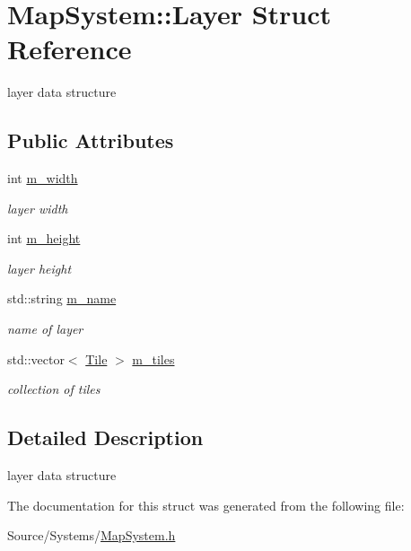 \hypertarget{struct_map_system_1_1_layer}{}\section{Map\+System\+:\+:Layer Struct Reference}
\label{struct_map_system_1_1_layer}


layer data structure  


\subsection*{Public Attributes}
\begin{DoxyCompactItemize}
\item 
\mbox{\label{struct_map_system_1_1_layer_aa16500709056b208b622705066e8bde1}} 
int \mbox{\hyperlink{struct_map_system_1_1_layer_aa16500709056b208b622705066e8bde1}{m\+\_\+width}}
\begin{DoxyCompactList}\small\item\em layer width \end{DoxyCompactList}\item 
\mbox{\label{struct_map_system_1_1_layer_ac993746071bcb5569752ef1a91d4046a}} 
int \mbox{\hyperlink{struct_map_system_1_1_layer_ac993746071bcb5569752ef1a91d4046a}{m\+\_\+height}}
\begin{DoxyCompactList}\small\item\em layer height \end{DoxyCompactList}\item 
\mbox{\label{struct_map_system_1_1_layer_a141c61aca2b7be1133c9646525c039ef}} 
std\+::string \mbox{\hyperlink{struct_map_system_1_1_layer_a141c61aca2b7be1133c9646525c039ef}{m\+\_\+name}}
\begin{DoxyCompactList}\small\item\em name of layer \end{DoxyCompactList}\item 
\mbox{\label{struct_map_system_1_1_layer_ab340778322da0ab61198363d250bdb91}} 
std\+::vector$<$ \mbox{\hyperlink{struct_map_system_1_1_tile}{Tile}} $>$ \mbox{\hyperlink{struct_map_system_1_1_layer_ab340778322da0ab61198363d250bdb91}{m\+\_\+tiles}}
\begin{DoxyCompactList}\small\item\em collection of tiles \end{DoxyCompactList}\end{DoxyCompactItemize}


\subsection{Detailed Description}
layer data structure 

The documentation for this struct was generated from the following file\+:\begin{DoxyCompactItemize}
\item 
Source/\+Systems/\mbox{\hyperlink{_map_system_8h}{Map\+System.\+h}}\end{DoxyCompactItemize}
